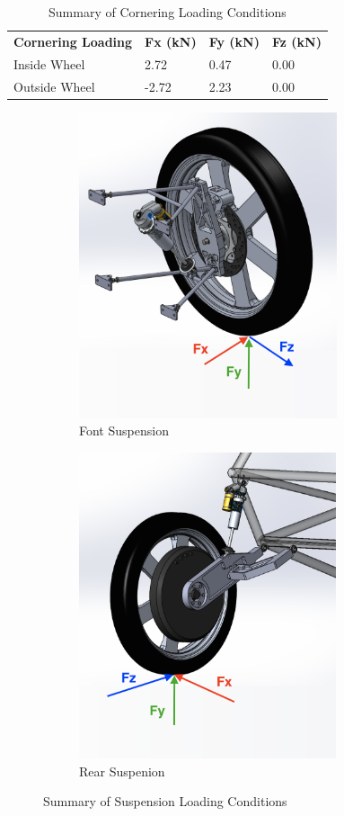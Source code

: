\documentclass[12pt]{article}
\begin{document}
\begin{table}[h!]
\centering
\caption{Summary of Cornering Loading Conditions}
\label{tab:summary}
\begin{tabular}{llll}
\textbf{Cornering Loading}  			       & \textbf{Fx (kN)} & \textbf{Fy (kN)} & \textbf{Fz (kN)} \\
Inside Wheel     						   & 2.72             & 0.47             & 0.00             \\
Outside Wheel   						   & -2.72            & 2.23             & 0.00             \\
\end{tabular}
\end{table}

\begin{figure}[h!]
	\centering
    \begin{subfigure}[b]{.48\textwidth}
		\caption{Font Suspension}
		\centering
        \includegraphics[height=9cm]{./LaTex/frontIsoForces.PNG}
    \end{subfigure}
    \begin{subfigure}[b]{.48\textwidth}
		\caption{Rear Suspenion}
		\centering
        \includegraphics[height=9cm]{./LaTex/rearIsoForces.PNG}
    \end{subfigure}
    \caption{Summary of Suspension Loading Conditions}
	\label{fig:forcesSummary}
\end{figure}
\end{document}
